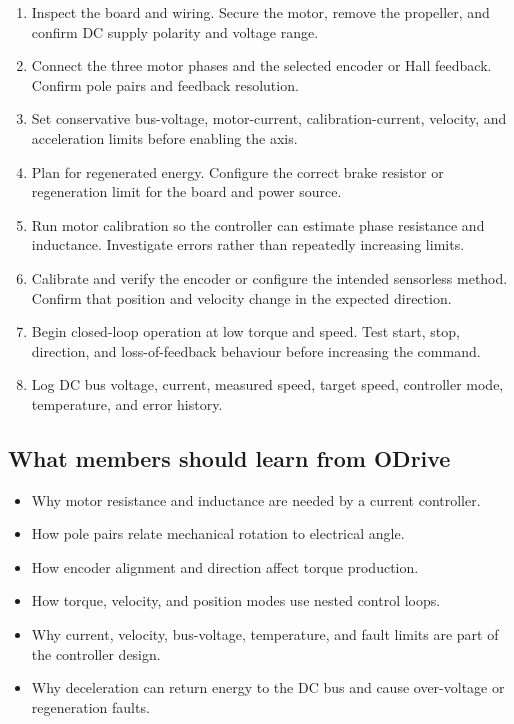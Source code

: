 \documentclass[11pt,a4paper]{article}
\begin{document}
\begin{enumerate}
  \item Inspect the board and wiring. Secure the motor, remove the propeller, and confirm DC supply polarity and voltage range.
  \item Connect the three motor phases and the selected encoder or Hall feedback. Confirm pole pairs and feedback resolution.
  \item Set conservative bus-voltage, motor-current, calibration-current, velocity, and acceleration limits before enabling the axis.
  \item Plan for regenerated energy. Configure the correct brake resistor or regeneration limit for the board and power source.
  \item Run motor calibration so the controller can estimate phase resistance and inductance. Investigate errors rather than repeatedly increasing limits.
  \item Calibrate and verify the encoder or configure the intended sensorless method. Confirm that position and velocity change in the expected direction.
  \item Begin closed-loop operation at low torque and speed. Test start, stop, direction, and loss-of-feedback behaviour before increasing the command.
  \item Log DC bus voltage, current, measured speed, target speed, controller mode, temperature, and error history.
\end{enumerate}

\subsection{What members should learn from ODrive}

\begin{itemize}
  \item Why motor resistance and inductance are needed by a current controller.
  \item How pole pairs relate mechanical rotation to electrical angle.
  \item How encoder alignment and direction affect torque production.
  \item How torque, velocity, and position modes use nested control loops.
  \item Why current, velocity, bus-voltage, temperature, and fault limits are part of the controller design.
  \item Why deceleration can return energy to the DC bus and cause over-voltage or regeneration faults.
\end{itemize}
\end{document}
